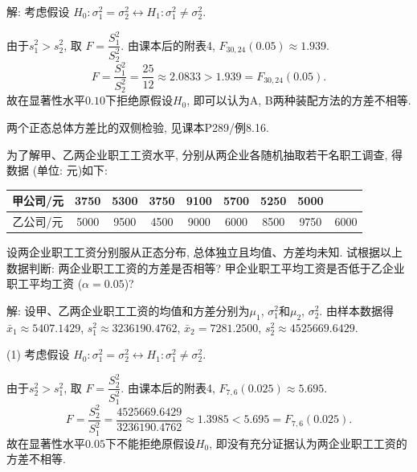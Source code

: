 \documentclass[standard]{ExBook}
\renewenvironment{shaded}{%
  \def\FrameCommand{\fboxsep=\FrameSep \colorbox{shadecolor}}%
  \MakeFramed{\advance\hsize-\width \FrameRestore}%
}{%
  \endMakeFramed
}
\begin{document}
\begin{qitems}
\vspace{\dimexpr2.5cm-5em\relax}

解: 考虑假设
$
H_0:\sigma_1^2=\sigma_2^2
\longleftrightarrow
H_1:\sigma_1^2\neq\sigma_2^2
$.

由于$s_1^2>s_2^2$, 取
$
F=\dfrac{S_1^2}{S_2^2}
$.
由课本后的附表4, $F_{30,24}(0.05)\approx1.939$.
$$
F
=
\frac{S_1^2}{S_2^2}
=
\frac{25}{12}
\approx2.0833
>
1.939
=
F_{30,24}(0.05).
$$
故在显著性水平$0.10$下拒绝原假设$H_0$, 即可以认为A, B两种装配方法的方差不相等.

\textcolor{themeColor}{\selectfont {} 两个正态总体方差比的双侧检验, 见课本P289/例8.16.}

\vspace{2.5cm-5em}

    \begin{bbox}
    \begin{shaded}
        \qitem
为了解甲、乙两企业职工工资水平, 分别从两企业各随机抽取若干名职工调查, 得数据 (单位: 元)如下:
\begin{center}
\setlength{\tabcolsep}{12pt}
\begin{tabular}{c|cccccccc}
\hline
甲公司/元 & 3750 & 5300 & 3750 & 9100 & 5700 & 5250 & 5000 &  \\
\hline
乙公司/元 & 5000 & 9500 & 4500 & 9000 & 6000 & 8500 & 9750 & 6000 \\
\hline
\end{tabular}
\end{center}
设两企业职工工资分别服从正态分布, 总体独立且均值、方差均未知. 试根据以上数据判断: 两企业职工工资的方差是否相等? 甲企业职工平均工资是否低于乙企业职工平均工资 ($\alpha=0.05$)?
    \end{shaded}
    \end{bbox}

\vspace{\dimexpr2.5cm-5em\relax}

解: 设甲、乙两企业职工工资的均值和方差分别为$\mu_1$, $\sigma_1^2$和$\mu_2$, $\sigma_2^2$. 由样本数据得
$
\bar{x}_1\approx5407.1429
$,
$
s_1^2\approx3236190.4762
$,
$
\bar{x}_2=7281.2500
$,
$
s_2^2\approx4525669.6429
$.

(1) 考虑假设
$
H_0:\sigma_1^2=\sigma_2^2
\longleftrightarrow
H_1:\sigma_1^2\neq\sigma_2^2
$.

由于$s_2^2>s_1^2$, 取
$
F=\dfrac{S_2^2}{S_1^2}
$.
由课本后的附表4, $F_{7,6}(0.025)\approx5.695$.
$$
F
=
\frac{S_2^2}{S_1^2}
=
\frac{4525669.6429}{3236190.4762}
\approx1.3985
<
5.695
=
F_{7,6}(0.025).
$$
故在显著性水平$0.05$下不能拒绝原假设$H_0$, 即没有充分证据认为两企业职工工资的方差不相等.


\end{qitems}
\end{document}
